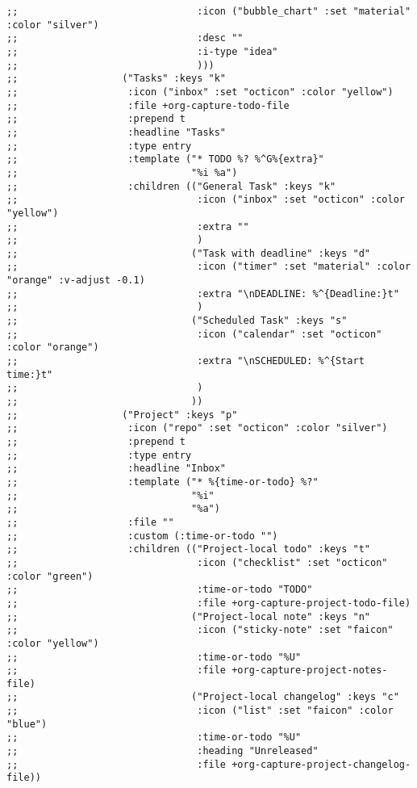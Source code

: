 \documentclass[11pt]{article}
\begin{document}
\begin{verbatim}
;;                               :icon ("bubble_chart" :set "material" :color "silver")
;;                               :desc ""
;;                               :i-type "idea"
;;                               )))
;;                  ("Tasks" :keys "k"
;;                   :icon ("inbox" :set "octicon" :color "yellow")
;;                   :file +org-capture-todo-file
;;                   :prepend t
;;                   :headline "Tasks"
;;                   :type entry
;;                   :template ("* TODO %? %^G%{extra}"
;;                              "%i %a")
;;                   :children (("General Task" :keys "k"
;;                               :icon ("inbox" :set "octicon" :color "yellow")
;;                               :extra ""
;;                               )
;;                              ("Task with deadline" :keys "d"
;;                               :icon ("timer" :set "material" :color "orange" :v-adjust -0.1)
;;                               :extra "\nDEADLINE: %^{Deadline:}t"
;;                               )
;;                              ("Scheduled Task" :keys "s"
;;                               :icon ("calendar" :set "octicon" :color "orange")
;;                               :extra "\nSCHEDULED: %^{Start time:}t"
;;                               )
;;                              ))
;;                  ("Project" :keys "p"
;;                   :icon ("repo" :set "octicon" :color "silver")
;;                   :prepend t
;;                   :type entry
;;                   :headline "Inbox"
;;                   :template ("* %{time-or-todo} %?"
;;                              "%i"
;;                              "%a")
;;                   :file ""
;;                   :custom (:time-or-todo "")
;;                   :children (("Project-local todo" :keys "t"
;;                               :icon ("checklist" :set "octicon" :color "green")
;;                               :time-or-todo "TODO"
;;                               :file +org-capture-project-todo-file)
;;                              ("Project-local note" :keys "n"
;;                               :icon ("sticky-note" :set "faicon" :color "yellow")
;;                               :time-or-todo "%U"
;;                               :file +org-capture-project-notes-file)
;;                              ("Project-local changelog" :keys "c"
;;                               :icon ("list" :set "faicon" :color "blue")
;;                               :time-or-todo "%U"
;;                               :heading "Unreleased"
;;                               :file +org-capture-project-changelog-file))

\end{verbatim}
\end{document}
